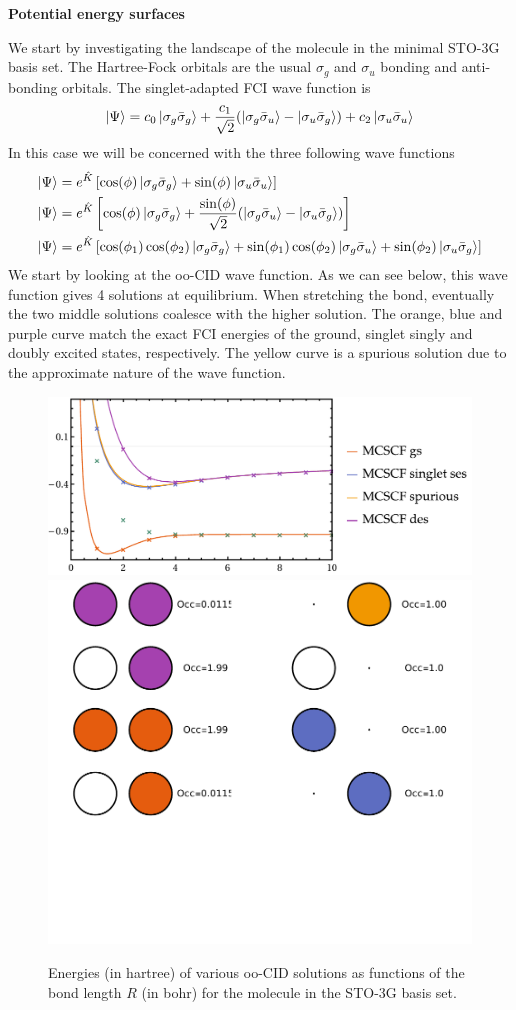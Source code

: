 \documentclass[11pt,a4paper]{article}
\newcommand{\hK}{\Hat{K}} %
\begin{document}
\textbf{Potential energy surfaces}

We start by investigating the landscape of the  molecule in the minimal STO-3G basis set.
The Hartree-Fock orbitals are the usual $\sigma_g$ and $\sigma_u$ bonding and anti-bonding orbitals.
The singlet-adapted FCI wave function is
\begin{equation}
  \label{eq:H2_FCI_WF}
  \ket{\Psi} = c_0\ket{\sigma_g\bar{\sigma}_g} + \frac{c_1}{\sqrt{2}}(\ket{\sigma_g\bar{\sigma}_u} - \ket{\sigma_u\bar{\sigma}_g}) + c_2\ket{\sigma_u\bar{\sigma}_u}
\end{equation}
In this case we will be concerned with the three following wave functions
\begin{subequations}
  \begin{align}
    \ket{\Psi} &= e^{\hK}\left[\cos(\phi)\ket{\sigma_g\bar{\sigma}_g} + \sin(\phi)\ket{\sigma_u\bar{\sigma}_u}\right] \\
    \ket{\Psi} &= e^{\hK}\left[\cos(\phi)\ket{\sigma_g\bar{\sigma}_g} + \frac{\sin(\phi)}{\sqrt{2}}(\ket{\sigma_g\bar{\sigma}_u} - \ket{\sigma_u\bar{\sigma}_g})\right]  \\
    \ket{\Psi} &= e^{\hK}\left[\cos(\phi_1)\cos(\phi_2)\ket{\sigma_g\bar{\sigma}_g} + \sin(\phi_1)\cos(\phi_2)\ket{\sigma_g\bar{\sigma}_u} + \sin(\phi_2) \ket{\sigma_u\bar{\sigma}_g}\right]
  \end{align}
\end{subequations}
We start by looking at the oo-CID wave function. As we can see below, this wave function gives 4 solutions at equilibrium. When stretching the bond, eventually the two middle solutions coalesce with the higher solution.
The orange, blue and purple curve match the exact FCI energies of the ground, singlet singly and doubly excited states, respectively.
The yellow curve is a spurious solution due to the approximate nature of the wave function.
\begin{figure}
  \centering
  \includegraphics[width=0.67\linewidth]{Figures/H2_ooCID_PES}
  \includegraphics[width=0.32\linewidth]{Figures/H2_ooCID_MO}
  \caption{
    Energies (in hartree) of various oo-CID solutions as functions of the bond length $R$ (in bohr) for the  molecule in the STO-3G basis set.
    \label{fig:H2ooCID}}
\end{figure}
\end{document}
